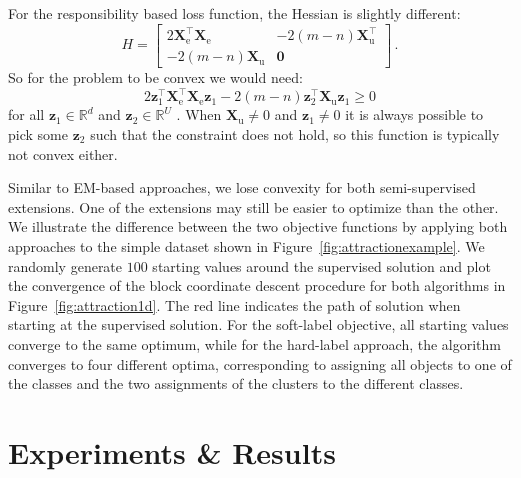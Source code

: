 \documentclass[twoside]{memoir}\usepackage[]{graphicx}\usepackage{xcolor}
\begin{document}
For the responsibility based loss function, the Hessian is slightly different:
$$
H=\begin{bmatrix} 
2 \mathbf{X}_\text{e}^\top \mathbf{X}_\text{e} & 
-2 (m-n)\mathbf{X}_\text{u}^\top \\
-2 (m-n) \mathbf{X}_\text{u} &
\mathbf{0}
\end{bmatrix} \,.
$$
So for the problem to be convex we would need:
$$
2 \mathbf{z}^\top_1 \mathbf{X}_\text{e}^\top \mathbf{X}_\text{e} \mathbf{z}_1 - 2 (m-n)  \mathbf{z}_2^\top \mathbf{X}_\text{u} \mathbf{z}_1 \geq 0
$$  
for all $\mathbf{z}_1 \in \mathbb{R}^{d}$ and $\mathbf{z}_2 \in \mathbb{R}^{U}$ . When $\mathbf{X}_\text{u}\neq 0$ and $\mathbf{z}_1\neq 0$  it is always possible to pick some $\mathbf{z}_2$ such that the constraint does not hold, so this function is typically not convex either.

Similar to EM-based approaches, we lose convexity for both semi-supervised extensions. One of the extensions may still be easier to optimize than the other. We illustrate the difference between the two objective functions by applying both approaches to the simple dataset shown in Figure~\ref{fig:attractionexample}. We randomly generate $100$ starting values around the supervised solution and plot the convergence of the block coordinate descent procedure for both algorithms in Figure~\ref{fig:attraction1d}. The red line indicates the path of solution when starting at the supervised solution. For the soft-label objective, all starting values converge to the same optimum, while for the hard-label approach, the algorithm converges to four different optima, corresponding to assigning all objects to one of the classes and the two assignments of the clusters to the different classes.

\section{Experiments \& Results}
\end{document}
